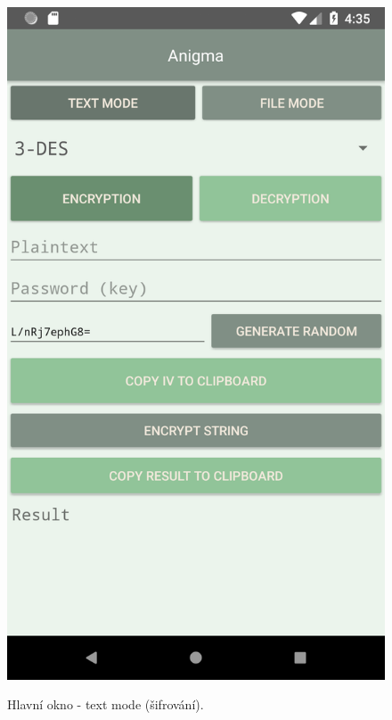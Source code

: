 \documentclass[12pt, a4paper]{article}
\begin{document}
\begin{figure}[h]
\caption{Hlavní okno - text mode (šifrování).}
\centering
\includegraphics[height=0.4\textheight]{main}
\label{fig:main}
\end{figure}
\end{document}
